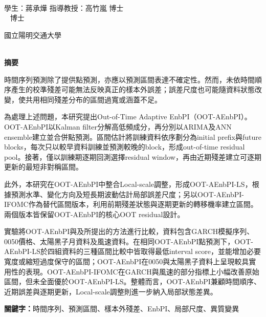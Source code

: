 \begin{center}
    \large
    \begin{singlespace}    
        \textbf{\chineseTitle{}} \\[0.5cm]
    \end{singlespace}

    \begin{singlespace}    
    學生：蔣承燁\studentCnName  \hspace{2.5cm}  指導教授：高竹嵐\advisorCnName \hspace{0.1cm} 博士 \\

    \ifdefined\advisorCnNameB %
        \hspace{9.6cm}  \advisorCnNameB ~ 博士 \\
    \fi
    \end{singlespace}

    \vspace{0.5cm}

    \begin{singlespace}
        國立陽明交通大學\\
        \NameofDepartmentInstituteCN\\[0.2cm]
    \end{singlespace}

    \textbf{摘\hspace{1cm}要} \\[0.5cm]

\end{center}

\normalsize 

時間序列預測除了提供點預測，亦應以預測區間表達不確定性。然而，未依時間順序產生的校準殘差可能無法反映真正的樣本外誤差；誤差尺度也可能隨資料狀態改變，使共用相同殘差分布的區間過寬或涵蓋不足。

為處理上述問題，本研究提出Out-of-Time Adaptive EnbPI（OOT-AEnbPI）。OOT-AEnbPI以Kalman filter分解高低頻成分，再分別以ARIMA及ANN ensemble建立並合併點預測。區間估計將訓練資料依序劃分為initial prefix與future blocks，每次只以較早資料訓練並預測較晚的block，形成out-of-time residual pool。接著，僅以訓練期逐期回測選擇residual window，再由近期殘差建立可逐期更新的最短非對稱區間。

此外，本研究在OOT-AEnbPI中整合Local-scale調整，形成OOT-AEnbPI-LS，根據預測水準、變化方向及短長期波動估計局部誤差尺度；另以OOT-AEnbPI-IFOMC作為替代區間版本，利用前期殘差狀態與逐期更新的轉移機率建立區間。兩個版本皆保留OOT-AEnbPI的核心OOT residual設計。

實驗將OOT-AEnbPI與\cite{hung2026thesis}及\cite{lin2024thesis}所提出的方法進行比較，資料包含GARCH模擬序列、0050價格、太陽黑子月資料及風速資料。在相同OOT-AEnbPI點預測下，OOT-AEnbPI-LS於四組資料的三種區間比較中皆取得最低interval score，並能增加必要寬度或縮短過度保守的區間；OOT-AEnbPI在0050與太陽黑子資料上呈現較具實用性的表現。OOT-AEnbPI-IFOMC在GARCH與風速的部分指標上小幅改善原始區間，但未全面優於OOT-AEnbPI-LS。整體而言，OOT-AEnbPI兼顧時間順序、近期誤差與逐期更新，Local-scale調整則進一步納入局部狀態差異。

\vspace{1cm}

\textbf{關鍵字：}時間序列、預測區間、樣本外殘差、EnbPI、局部尺度、異質變異
